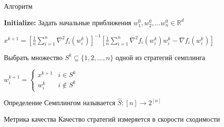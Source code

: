 \documentclass{beamer}
\begin{document}
\begin{frame}{Алгоритм}

	\begin{algorithmic}
		\item \textbf{Initialize:} Задать начальные приближения $w_1^0, w_2^0, ... w_n^0 \in \mathbb R^d$
		
		\item {}	
		
		$ x^{k+1} = \left[ \frac{1}{n} \sum \limits_{i=1}^n \nabla^2 f_i(w_i^k) \right]^{-1} \left[ \frac{1}{n} \sum \limits_{i=1}^n \nabla^2 f_i(w_i^k) w_i^k - \nabla f_i(w_i^k) \right] $
		
		Выбрать множество $S^k \subseteq \{ 1, 2, ..., n \}$ одной из стратегий семплинга
		
		$w_i^{k+1} = 
		\begin{cases}
			x^{k+1} & i \in S^k \\
			w_i^k & i \notin S^k
		\end{cases}$
		
		\item \EndFor
	\end{algorithmic}
	
	\begin{block}{Определение}
	Семплингом называется $\hat S: [n] \rightarrow 2^{[n]}$ 
	\end{block}

	\begin{block}{Метрика качества}
		Качество стратегий измеряется в скорости сходимости
	\end{block}

\end{frame}
\end{document}
